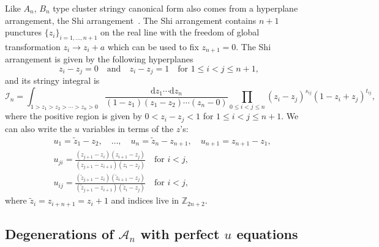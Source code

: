 \documentclass[hidelinks,12pt]{article}
\begin{document}

Like $A_n$, $B_n$ type cluster stringy canonical form also comes from a hyperplane 
arrangement, the Shi arrangement~\cite{shi1986kazhdan}. The Shi arrangement contains $n+1$ punctures 
$\{z_i\}_{i=1,\dots,n+1}$ on the real line with the freedom of global transformation 
$z_i\to z_i+a$ which can be used to fix $z_{n+1}=0$. The Shi arrangement is 
given by the following hyperplanes
\[
	z_i-z_j=0\quad \text{and}\quad z_i-z_j=1\quad \text{for $1\leq i<j\leq n+1$},
\]
and its stringy integral is 
\begin{equation}
\mathcal I_n = \int_{1>z_1>z_2>\cdots >z_n>0}
\frac{\mathrm dz_1\cdots \mathrm dz_{n}}{(1-z_1)(z_1-z_2)\cdots (z_{n}-0)}
\prod_{0\leq i<j \leq n}(z_i-z_j)^{s_{ij}}(1-z_i+z_j)^{t_{ij}},
\end{equation}
where the positive region is given by $0<z_i-z_j<1$ for $1\leq i<j \leq n+1$.
We can also write the $u$ variables in terms of the $z$'s:
\begin{align*}
    &u_1=\tilde z_1-z_2,\quad \dots,\quad u_{n}=\tilde z_{n}-z_{n+1},
    \quad u_{n+1}=z_{n+1}-z_1,\\
    &u_{ji}=\frac{(z_{j+1}-z_{i})(z_{i+1}-z_j)}{(z_{j+1}-z_{i+1})(z_i-z_j)}\quad \text{for $i<j$},\\
    &u_{ij}=\frac{(\tilde z_{j+1}-z_{i})(\tilde z_{i+1}-z_j)}{(\tilde z_{j+1}-z_{i+1})(\tilde z_i-z_j)}\quad \text{for $i<j$},
\end{align*}
where $\tilde{z}_i=z_{i+n+1}=z_{i}+1$ and indices live in $\mathbb Z_{2n+2}$.

\subsection{Degenerations of $\mathscr A_n$ with perfect $u$ equations} 
\end{document}
